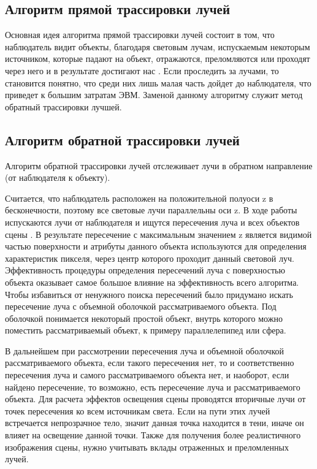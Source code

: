 \subsection{Алгоритм прямой трассировки лучей}

Основная идея алгоритма прямой трассировки лучей состоит в том, что наблюдатель видит объекты, благодаря световым лучам, испускаемым некоторым источником, которые падают на объект, отражаются, преломляются или проходят через него и в результате достигают нас \cite{tr3}. Если проследить за лучами, то становится понятно, что среди них лишь малая часть дойдет до наблюдателя, что приведет к большим затратам ЭВМ. Заменой данному алгоритму служит метод обратный трассировки лучшей.

\subsection{Алгоритм обратной трассировки лучей}

Алгоритм обратной трассировки лучей отслеживает лучи в обратном направление (от наблюдателя к объекту).

Считается, что наблюдатель расположен на положительной полуоси z в бесконечности, поэтому все световые лучи параллельны оси z. В ходе работы испускаются лучи от наблюдателя и ищутся пересечения луча и всех объектов сцены \cite{tr3}. В результате пересечение с максимальным значением z является видимой частью поверхности и атрибуты данного объекта используются для определения характеристик пикселя, через центр которого проходит данный световой луч. Эффективность процедуры определения пересечений луча с поверхностью объекта оказывает самое большое влияние на эффективность всего алгоритма. Чтобы избавиться от ненужного поиска пересечений было придумано искать пересечение луча с объемной оболочкой рассматриваемого объекта. Под оболочкой понимается некоторый простой объект, внутрь которого можно поместить рассматриваемый объект, к примеру параллелепипед или сфера.

\begin{figure}[ht!]
\end{figure}

В дальнейшем при рассмотрении пересечения луча и объемной оболочкой рассматриваемого объекта, если такого пересечения нет, то и соответственно пересечения луча и самого рассматриваемого объекта нет, и наоборот, если найдено пересечение, то возможно, есть пересечение луча и рассматриваемого объекта. Для расчета эффектов освещения сцены проводятся вторичные лучи от точек пересечения ко всем источникам света. Если на пути этих лучей встречается непрозрачное тело, значит данная точка находится в тени, иначе он влияет на освещение данной точки. Также для получения более реалистичного изображения сцены, нужно учитывать вклады отраженных и преломленных лучей.

